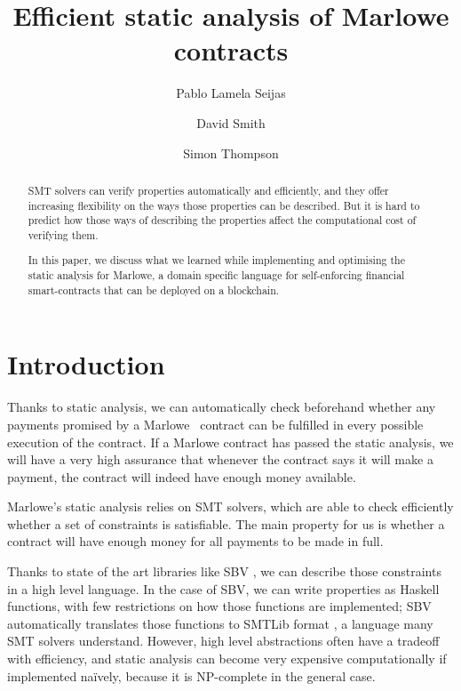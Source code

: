 \documentclass[english,runningheads]{llncs}
\begin{document}
\title{Efficient static analysis of Marlowe contracts}

\author{Pablo {Lamela Seijas} \and
        David Smith \and
        Simon Thompson}



\maketitle
\begin{abstract}
SMT solvers can verify properties automatically and efficiently, and they offer increasing
flexibility on the ways those properties can be described. But it is hard to predict how those ways of describing the properties affect the computational cost of verifying them.

In this paper, we discuss what we learned while implementing and optimising the static analysis for Marlowe, a domain specific language for self-enforcing financial smart-contracts that can be deployed on a blockchain.
\end{abstract}
\section{Introduction\label{sec:Introduction}}

Thanks to static analysis, we can automatically check beforehand whether any
payments promised by a Marlowe~\cite{marlowe2020,Marlowe:2018} contract can be fulfilled in every
possible execution of the contract. If a Marlowe contract has passed
the static analysis, we will have a very high assurance
that whenever the contract says it will make a payment, the contract will
indeed have enough money available.

Marlowe's static analysis relies on SMT solvers, which are able to check efficiently
whether a set of constraints is satisfiable. The main property for us is whether a contract will have enough money for all payments to be made in full.

Thanks to state of the art
libraries like SBV \cite{erkok2019sbv}, we can describe those constraints in a
high level language. In the case of SBV, we can write properties as
Haskell functions, with few restrictions on how those functions are
implemented; SBV automatically translates those functions to SMTLib format \cite{barrett2010smt}, a language many SMT solvers understand.
However, high level abstractions often have a tradeoff with efficiency, and static analysis can become very expensive computationally if
implemented naïvely, because it is NP-complete in the general case.
 
\end{document}
